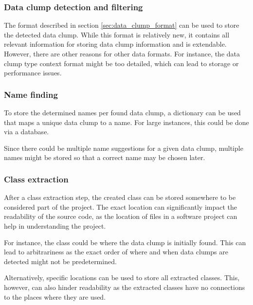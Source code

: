 \subsubsection{Data clump detection and filtering}

The format described in section \ref{sec:data_clump_format} can be used to store the detected data clump. While this format is relatively new, it contains all relevant information for storing data clump information and is extendable. However, there are other reasons for other data formats. For instance,  the data clump type context format might be too detailed, which can lead to storage or performance issues. 

\subsubsection{Name finding}
To store the determined names per found data clump, a dictionary can be used that maps a unique data clump to a name. For large instances, this could be done via a database. 

Since there could be multiple name suggestions for a given data clump, multiple names might be stored so that a correct name may be chosen later.

\subsubsection{Class extraction}

After a class extraction step, the created class can be stored somewhere to be considered part of the project. The exact location can significantly impact the readability of the source code, as the location of files in a software project can help in understanding the project. 

For instance, the class could be where the data clump is initially found. This can lead to arbitrariness as the exact order of where and when data clumps are detected might not be predetermined. 

Alternatively, specific locations can be used to store all extracted classes. This, however, can also hinder readability as the extracted classes have no connections to the places where they are used.  

